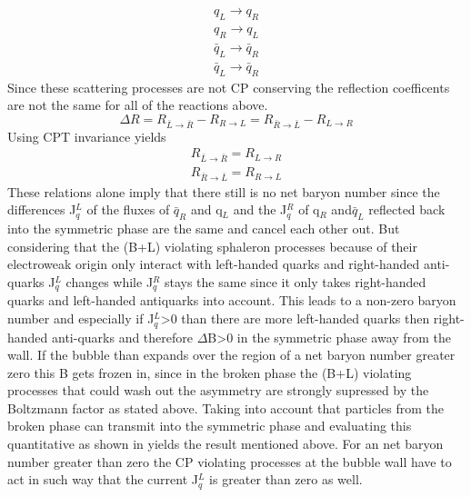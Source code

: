 \begin{align*}
	q_L\rightarrow q_R\\
	q_R\rightarrow q_L\\
	\bar{q}_L\rightarrow \bar{q}_R\\
	\bar{q}_L\rightarrow \bar{q}_R
\end{align*}
Since these scattering processes are not CP conserving the reflection coefficents are not the same for all of the reactions above.
\begin{equation}
	\Delta R=R_{\bar{L}\rightarrow\bar{R}}-R_{R\rightarrow L}=R_{\bar{R}\rightarrow\bar{L}}-R_{L\rightarrow R}
	\label{reflection_coeff}
\end{equation}
Using CPT invariance yields
\begin{align}
	R_{\bar{L}\rightarrow\bar{R}}=R_{L\rightarrow R}\\
	R_{\bar{R}\rightarrow\bar{L}}=R_{R\rightarrow L}
\end{align}
These relations alone imply that there still is no net baryon number since the differences J$^L_q$ of the fluxes of $\bar{q}_R$ and q$_L$ and the  J$^R_q$ of q$_R$ and$\bar{q}_L$ reflected back into the symmetric phase are the same and cancel each other out. But considering that the (B+L) violating sphaleron processes because of their electroweak origin only interact with left-handed quarks and right-handed anti-quarks J$^L_q$ changes while  J$^R_q$ stays the same since it only takes right-handed quarks and left-handed antiquarks into account. This leads to a non-zero baryon number and especially if  J$^L_q$>0 than there are more left-handed quarks then right-handed anti-quarks and therefore $\Delta$B>0 in the symmetric phase away from the wall. If the bubble than expands over the region of a net baryon number greater zero this B gets frozen in, since in the broken phase the (B+L) violating processes that could wash out the asymmetry are strongly supressed by the Boltzmann factor as stated above. \newline
Taking into account that particles from the broken phase can transmit into the symmetric phase and evaluating this quantitative as shown in \cite[pp. 36-37]{Bernreuther:2002uj} yields the result mentioned above. For an net baryon number greater than zero the CP violating processes at the bubble wall have to act in such way that the current J$^L_q$ is greater than zero as well. 
